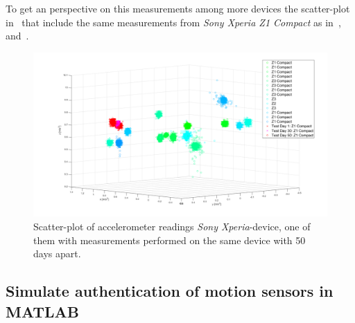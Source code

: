 To get an perspective on this measurements among more devices the scatter-plot in~ that include the same measurements from \textit{Sony Xperia Z1 Compact} as in~,~ and~.
\begin{figure}[H]
	\centering
	\includegraphics[scale=.3]{img/senrec-sony_scatter-2}
	\caption{Scatter-plot of accelerometer readings \textit{Sony Xperia}-device, one of them with measurements performed on the same device with 50 days apart.}
	\label{fig:scatterSony50days}
\end{figure}

\subsection{Simulate authentication of motion sensors in MATLAB}


